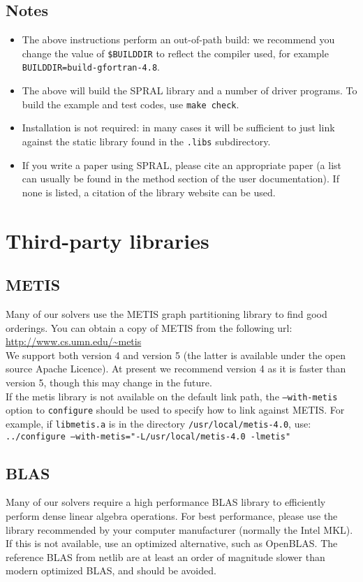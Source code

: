 \documentclass{spral}
\begin{document}
\subsection*{Notes}
\begin{itemize}
   \item The above instructions perform an out-of-path build: we recommend you
      change the value of \texttt{\$BUILDDIR} to reflect the compiler used, for
      example \texttt{BUILDDIR=build-gfortran-4.8}.
   \item The above will build the SPRAL library and a number of driver programs.
      To build the example and test codes, use \texttt{make check}.
   \item Installation is not required: in many cases it will be sufficient to
      just link against the static library found in the \texttt{.libs}
      subdirectory.
   \item If you write a paper using SPRAL, please cite an appropriate paper
      (a list can usually be found in the method section of the user
      documentation). If none is listed, a citation of the library website
      can be used.
\end{itemize}

\section{Third-party libraries}
\subsection{METIS}
Many of our solvers use the METIS graph partitioning library to find good
orderings. You can obtain a copy of METIS from the following url:\\
\url{http://www.cs.umn.edu/~metis}\\
We support both version 4 and version 5 (the latter is available under the open source Apache Licence). At present we recommend version 4 as it is faster than
version 5, though this may change in the future.\\
If the metis library is not available on the default link path, the
\texttt{--with-metis} option to \texttt{configure} should be used to specify
how to link against METIS. For example, if \texttt{libmetis.a} is in the directory \texttt{/usr/local/metis-4.0}, use: \\
\texttt{../configure --with-metis="-L/usr/local/metis-4.0 -lmetis"}

\subsection{BLAS}
Many of our solvers require a high performance BLAS library to efficiently
perform dense linear algebra operations. For best performance, please use the
library recommended by your computer manufacturer (normally the Intel MKL).
If this is not available, use an optimized alternative, such as OpenBLAS.
The reference BLAS from netlib are at least an order of magnitude slower than
modern optimized BLAS, and should be avoided. \\
\end{document}
